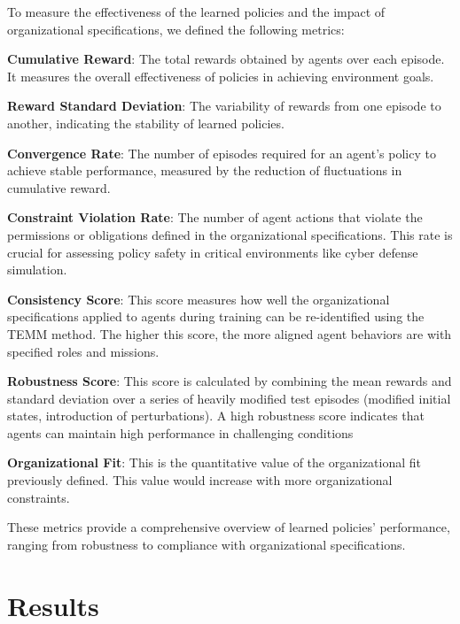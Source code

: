 \documentclass[sigconf,anonymous]{aamas}
\begin{document}
To measure the effectiveness of the learned policies and the impact of organizational specifications, we defined the following metrics:
%
\begin{enumerate*}[label={\roman*)}, itemjoin={; \quad}]
    \item \textbf{Cumulative Reward}: The total rewards obtained by agents over each episode. It measures the overall effectiveness of policies in achieving environment goals.
    \item \textbf{Reward Standard Deviation}: The variability of rewards from one episode to another, indicating the stability of learned policies.
    \item \textbf{Convergence Rate}: The number of episodes required for an agent's policy to achieve stable performance, measured by the reduction of fluctuations in cumulative reward.
    \item \textbf{Constraint Violation Rate}: The number of agent actions that violate the permissions or obligations defined in the organizational specifications. This rate is crucial for assessing policy safety in critical environments like cyber defense simulation.
    \item \textbf{Consistency Score}: This score measures how well the organizational specifications applied to agents during training can be re-identified using the TEMM method. The higher this score, the more aligned agent behaviors are with specified roles and missions.
    \item \textbf{Robustness Score}: This score is calculated by combining the mean rewards and standard deviation over a series of heavily modified test episodes (modified initial states, introduction of perturbations). A high robustness score indicates that agents can maintain high performance in challenging conditions
    \item \textbf{Organizational Fit}: This is the quantitative value of the organizational fit previously defined. This value would increase with more organizational constraints.
\end{enumerate*}

These metrics provide a comprehensive overview of learned policies' performance, ranging from robustness to compliance with organizational specifications.

\section{Results}
\label{sec:results}
\end{document}

